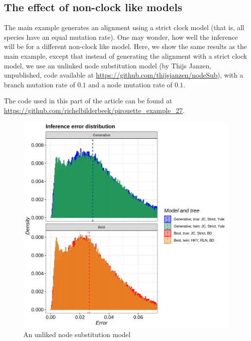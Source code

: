 \subsection{The effect of non-clock like models}
\label{subsec:non_clock}


The main example generates an alignment using a strict clock model (that is,
all species have an equal mutation rate).
One may wonder, how well the inference will be for a different non-clock like
model.
Here, we show the same results as the main example,
except that instead of generating the alignment with a strict clock
model, we use an unlinked node substitution model (by Thijs Janzen,
unpublished, code available at \url{https://github.com/thijsjanzen/nodeSub}),
with a branch mutation rate of $0.1$ and a node mutation rate of $0.1$.

The code used in this part of the article can be found at 
\url{https://github.com/richelbilderbeek/pirouette_example_27}.

\begin{figure}[H]
  \includegraphics[width=\textwidth]{pirouette_example_27/errors.png}
  \caption{An unliked node substitution model}
\end{figure}

